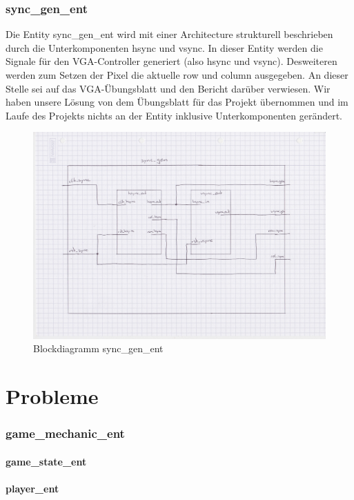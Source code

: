 \documentclass[parskip=full]{scrartcl}
\begin{document}
		\section{sync\_gen\_ent}
			Die Entity sync\_gen\_ent wird mit einer Architecture strukturell beschrieben durch die Unterkomponenten hsync und vsync. In dieser Entity werden die Signale für den VGA-Controller generiert (also hsync und vsync). Desweiteren werden zum Setzen der Pixel die aktuelle row und column ausgegeben.
			An dieser Stelle sei auf das VGA-Übungsblatt und den Bericht darüber verwiesen. Wir haben unsere Lösung von dem Übungsblatt für das Projekt übernommen und im Laufe des Projekts nichts an der Entity inklusive Unterkomponenten gerändert.
			\begin{figure}[H]
				\centering
				\includegraphics[scale=0.1]{./bilder/Sync_gen.jpeg}
				\caption{Blockdiagramm sync\_gen\_ent}
			\end{figure}
		
	\part{Probleme}

		\section{game\_mechanic\_ent}

			\subsection{game\_state\_ent}

			\subsection{player\_ent}
\end{document}

